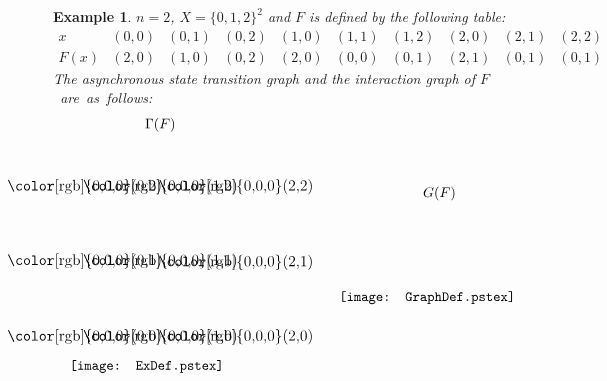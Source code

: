 \documentclass[11pt]{article}
\newtheorem{example}{Example}
\begin{document}
\begin{example}
$n=2$, $X=\{0,1,2\}^2$ and $F$ is defined by the following table:
\[
\begin{array}{c|ccccccccc}
x    &(0,0)&(0,1)&(0,2)&(1,0)&(1,1)&(1,2)&(2,0)&(2,1)&(2,2)\\\hline
F(x) &(2,0)&(1,0)&(0,2)&(2,0)&(0,0)&(0,1)&(2,1)&(0,1)&(0,1)
\end{array}
\]
The asynchronous state transition graph and the interaction graph of $F$~are~as~follows:
\[
\begin{array}{c}
\Gamma(F)\\[5mm]
\begin{picture}(0,0)\texttt{[image: ExDef.pstex]}\end{picture}\setlength{\unitlength}{3947sp}\begingroup\makeatletter\ifx\SetFigFont\undefined \gdef\SetFigFont#1#2#3#4#5{\reset@font\fontsize{#1}{#2pt}\fontfamily{#3}\fontseries{#4}\fontshape{#5}\selectfont}\fi\endgroup \begin{picture}(2153,2575)(2673,-4802)
\put(2850,-4456){\makebox(0,0)[b]{\smash{{\SetFigFont{11}{13.2}{\rmdefault}{\mddefault}{\updefault}{\color[rgb]{0,0,0}(0,0)}}}}}
\put(2850,-3556){\makebox(0,0)[b]{\smash{{\SetFigFont{11}{13.2}{\rmdefault}{\mddefault}{\updefault}{\color[rgb]{0,0,0}(0,1)}}}}}
\put(3750,-3556){\makebox(0,0)[b]{\smash{{\SetFigFont{11}{13.2}{\rmdefault}{\mddefault}{\updefault}{\color[rgb]{0,0,0}(1,1)}}}}}
\put(3750,-4456){\makebox(0,0)[b]{\smash{{\SetFigFont{11}{13.2}{\rmdefault}{\mddefault}{\updefault}{\color[rgb]{0,0,0}(1,0)}}}}}
\put(4650,-4456){\makebox(0,0)[b]{\smash{{\SetFigFont{11}{13.2}{\rmdefault}{\mddefault}{\updefault}{\color[rgb]{0,0,0}(2,0)}}}}}
\put(2850,-2671){\makebox(0,0)[b]{\smash{{\SetFigFont{11}{13.2}{\rmdefault}{\mddefault}{\updefault}{\color[rgb]{0,0,0}(0,2)}}}}}
\put(3750,-2671){\makebox(0,0)[b]{\smash{{\SetFigFont{11}{13.2}{\rmdefault}{\mddefault}{\updefault}{\color[rgb]{0,0,0}(1,2)}}}}}
\put(4650,-2671){\makebox(0,0)[b]{\smash{{\SetFigFont{11}{13.2}{\rmdefault}{\mddefault}{\updefault}{\color[rgb]{0,0,0}(2,2)}}}}}
\put(4650,-3571){\makebox(0,0)[b]{\smash{{\SetFigFont{11}{13.2}{\rmdefault}{\mddefault}{\updefault}{\color[rgb]{0,0,0}(2,1)}}}}}
\end{picture} \end{array}
~~~~~~~~~~~~~~~~
\begin{array}{c}
G(F)\\[5mm]
\begin{picture}(0,0)\texttt{[image: GraphDef.pstex]}\end{picture}\setlength{\unitlength}{3947sp}\begingroup\makeatletter\ifx\SetFigFont\undefined \gdef\SetFigFont#1#2#3#4#5{\reset@font\fontsize{#1}{#2pt}\fontfamily{#3}\fontseries{#4}\fontshape{#5}\selectfont}\fi\endgroup \begin{picture}(2383,940)(2135,-3879)

\end{picture}
\end{array}\]
\end{example}
\end{document}
